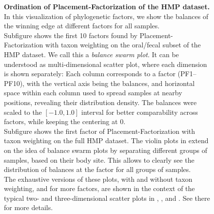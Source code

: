 \begin{figure}[hbt!]
    \centering
    \begin{subfigure}{0pt}
        \label{fig:hmp_pf:sub:of_600_swarm}
    \end{subfigure}
    \begin{subfigure}{0pt}
        \label{fig:hmp_pf:sub:all_violin}
    \end{subfigure}
    \caption{
        \textbf{Ordination of Placement-Factorization of the \ac{HMP} dataset.}
        In this visualization of phylogenetic factors,
        we show the balances of the winning edge at different factors for all samples.
        \\
        Subfigure  shows the first \num{10} factors
        found by Placement-Factorization with taxon weighting on the oral/fecal subset of the \ac{HMP} dataset.
        We call this a \emph{balance swarm plot}.
        It can be understood as multi-dimensional scatter plot, where each dimension is shown separately:
        Each column corresponds to a factor (PF1--PF10), with the vertical axis being the balances,
        and horizontal space within each column used to spread samples at nearby positions,
        revealing their distribution density.
        The balances were scaled to the $[-1.0, 1.0]$ interval for better comparability across factors,
        while keeping the centering at \num{0}.
        \\
        Subfigure  shows the first factor of Placement-Factorization with taxon weighting
        on the full \ac{HMP} dataset.
        The violin plots in  extend on the idea of balance swarm plots
        by separating different groups of samples, based on their body site.
        This allows to clearly see the distribution of balances at the factor for all groups of samples.
        \\
        The exhaustive versions of these plots, with and without taxon weighting, and for more factors,
        are shown in the context of the typical two- and three-dimensional scatter plots in
        , , and
        .
        See there for more details.
    }
    \label{fig:hmp_pf}
\end{figure}

